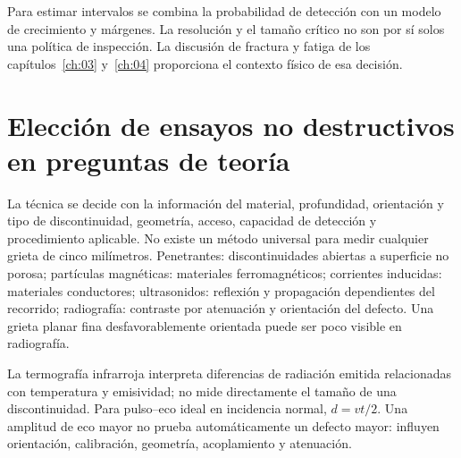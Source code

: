Para estimar intervalos se combina la probabilidad de detección con un modelo de crecimiento y márgenes. La resolución y el tamaño crítico no son por sí solos una política de inspección. La discusión de fractura y fatiga de los capítulos~\ref{ch:03} y~\ref{ch:04} proporciona el contexto físico de esa decisión.
\section{Elección de ensayos no destructivos en preguntas de teoría}
La técnica se decide con la información del material, profundidad, orientación y tipo de discontinuidad, geometría, acceso, capacidad de detección y procedimiento aplicable. No existe un método universal para medir cualquier grieta de cinco milímetros. Penetrantes: discontinuidades abiertas a superficie no porosa; partículas magnéticas: materiales ferromagnéticos; corrientes inducidas: materiales conductores; ultrasonidos: reflexión y propagación dependientes del recorrido; radiografía: contraste por atenuación y orientación del defecto. Una grieta planar fina desfavorablemente orientada puede ser poco visible en radiografía.

La termografía infrarroja interpreta diferencias de radiación emitida relacionadas con temperatura y emisividad; no mide directamente el tamaño de una discontinuidad. Para pulso--eco ideal en incidencia normal, $d=vt/2$. Una amplitud de eco mayor no prueba automáticamente un defecto mayor: influyen orientación, calibración, geometría, acoplamiento y atenuación.


